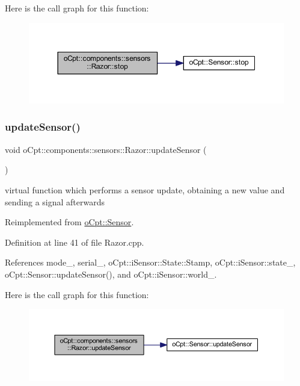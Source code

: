 Here is the call graph for this function\+:\nopagebreak
\begin{figure}[H]
\begin{center}
\leavevmode
\includegraphics[width=350pt]{classo_cpt_1_1components_1_1sensors_1_1_razor_a807441c137892ee3c1b612c284893fa1_cgraph}
\end{center}
\end{figure}
\hypertarget{classo_cpt_1_1components_1_1sensors_1_1_razor_ac8ee1582eb5c478c73e5e050858d2d7d}{}\label{classo_cpt_1_1components_1_1sensors_1_1_razor_ac8ee1582eb5c478c73e5e050858d2d7d} 
\subsubsection{\texorpdfstring{update\+Sensor()}{updateSensor()}}
{\footnotesize\ttfamily void o\+Cpt\+::components\+::sensors\+::\+Razor\+::update\+Sensor (\begin{DoxyParamCaption}{ }\end{DoxyParamCaption})\hspace{0.3cm}{\ttfamily [virtual]}}

virtual function which performs a sensor update, obtaining a new value and sending a signal afterwards 

Reimplemented from \hyperlink{classo_cpt_1_1_sensor_ab4b0dedb06f11bcf2368852035beb2b2}{o\+Cpt\+::\+Sensor}.



Definition at line 41 of file Razor.\+cpp.



References mode\+\_\+, serial\+\_\+, o\+Cpt\+::i\+Sensor\+::\+State\+::\+Stamp, o\+Cpt\+::i\+Sensor\+::state\+\_\+, o\+Cpt\+::\+Sensor\+::update\+Sensor(), and o\+Cpt\+::i\+Sensor\+::world\+\_\+.

Here is the call graph for this function\+:\nopagebreak
\begin{figure}[H]
\begin{center}
\leavevmode
\includegraphics[width=350pt]{classo_cpt_1_1components_1_1sensors_1_1_razor_ac8ee1582eb5c478c73e5e050858d2d7d_cgraph}
\end{center}
\end{figure}


